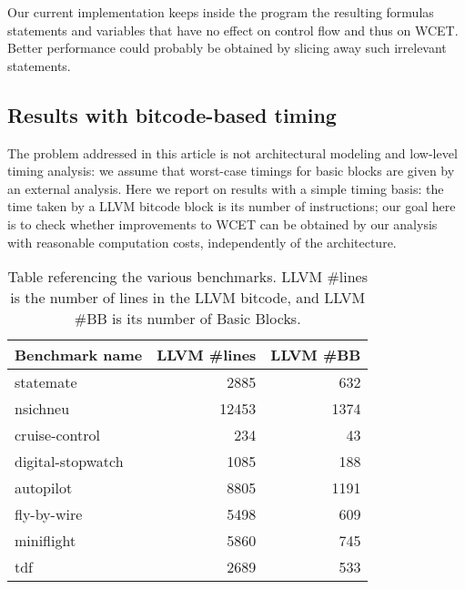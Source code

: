 \documentclass[a4paper,twocolumn,11pt]{article}
\begin{document}
Our current implementation keeps inside the program the resulting formulas statements and variables that have no effect on control flow and thus on WCET. Better performance could probably be obtained by slicing away such irrelevant statements.

\subsection{Results with bitcode-based timing}
The problem addressed in this article is not architectural modeling and low-level timing analysis: we assume that worst-case timings for basic blocks are given by an external analysis.
Here we report on results with a simple timing basis: the time taken by a LLVM bitcode block is its number of instructions;
our goal here is to check whether improvements to WCET can be obtained by our analysis with reasonable computation costs, independently of the architecture.

\begin{table}\small
\centering
\begin{tabular}{|l|r|r|} \hline
	Benchmark name & LLVM \#lines & LLVM \#BB \\ \hline
  statemate  	&  2885 	&  632  \\ 
nsichneu  	&  12453 	&  1374  \\ 
cruise-control  	&  234 	&  43  \\ 
digital-stopwatch  	&  1085 	&  188  \\ 
autopilot  	&  8805 	&  1191  \\ 
fly-by-wire  	&  5498 	&  609  \\ 
miniflight  	&  5860 	&  745  \\ 
tdf  	&  2689 	&  533  \\ 
 	\hline
\end{tabular}
\caption{Table referencing the various benchmarks. LLVM \#lines is the number of lines in the LLVM bitcode, and LLVM \#BB is its number of Basic Blocks.}
\label{tab:benchmarkslist}
\end{table}
\end{document}
